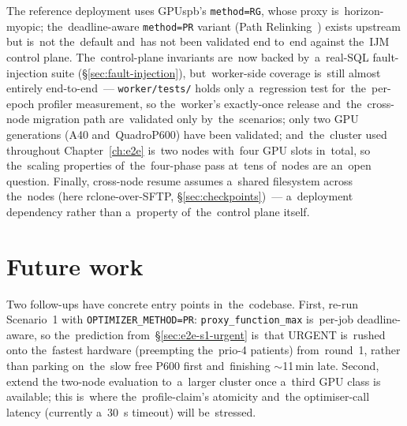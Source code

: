 The reference deployment uses GPUspb's \texttt{method=RG}, whose proxy
is~horizon-myopic; the~deadline-aware \texttt{method=PR} variant
(Path Relinking~\cite{filippini2023pathrelinking}) exists upstream but
is~not the~default and~has not been validated end
to~end against the~IJM control plane.  The~control-plane invariants are~now
backed by~a~real-SQL fault-injection suite (\S\ref{sec:fault-injection}),
but~worker-side coverage is~still almost entirely end-to-end~---
\texttt{worker/tests/} holds only a~regression test for~the~per-epoch profiler
measurement, so the~worker's exactly-once release and~the~cross-node migration
path are~validated only by~the~scenarios; only two GPU
generations (A40 and~QuadroP600) have been validated; and~the~cluster
used throughout Chapter~\ref{ch:e2e} is~two nodes with~four GPU slots
in~total, so the~scaling properties of~the~four-phase pass at~tens
of~nodes are an~open question.  Finally, cross-node resume assumes
a~shared filesystem across the~nodes (here rclone-over-SFTP,
\S\ref{sec:checkpoints})~--- a~deployment dependency rather than
a~property of~the~control plane itself.

\section{Future work}

Two follow-ups have concrete entry points in~the~codebase.  First,
re-run Scenario~1 with
\texttt{OPTIMIZER\_METHOD=PR}: \texttt{proxy\_function\_max} is~per-job
deadline-aware, so the~prediction from~\S\ref{sec:e2e-s1-urgent}
is~that URGENT is~rushed onto the~fastest hardware (preempting the~prio-4
patients) from~round~1, rather than parking on~the~slow free P600 first
and~finishing $\sim$11\,min late.  Second, extend the
two-node evaluation to~a~larger cluster once a~third GPU class is
available; this is~where the~profile-claim's atomicity and~the
optimiser-call latency (currently a~30~s timeout) will be~stressed.
